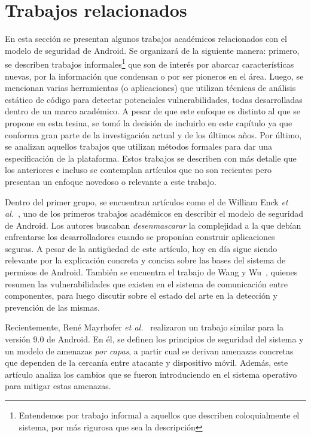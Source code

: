 
\chapter{Trabajos relacionados}
\label{chapter:estado}

En esta sección se presentan algunos trabajos académicos relacionados con el modelo de seguridad de
Android. Se organizará de la siguiente manera: primero, se describen trabajos
informales\footnote{Entendemos por trabajo informal a aquellos que describen coloquialmente el
    sistema, por más rigurosa que sea la descripción} que son de interés por abarcar características
nuevas, por la información que condensan o por ser pioneros en el área. Luego, se mencionan varias
herramientas (o aplicaciones) que utilizan técnicas de análisis estático de código para detectar
potenciales vulnerabilidades, todas desarrolladas dentro de un marco académico. A pesar de que este
enfoque  es distinto al que se propone en esta tesina, se tomó la decisión de incluirlo en este
capítulo ya que conforma gran parte de la investigación actual y de los últimos años. Por último, se
analizan aquellos trabajos que utilizan métodos formales para dar una especificación de la
plataforma. Estos trabajos se describen con más detalle que los anteriores e incluso se contemplan
artículos que no son recientes pero presentan un enfoque novedoso o relevante a este trabajo.

Dentro del primer grupo, se encuentran artículos como el de William Enck \textit{et
    al.}~\cite{enck}, uno de los primeros trabajos académicos en describir el modelo de seguridad de
Android. Los autores buscaban \textit{desenmascarar} la complejidad a la que debían enfrentarse los
desarrolladores cuando se proponían construir aplicaciones seguras. A pesar de la antigüedad de este
artículo, hoy en día sigue siendo relevante por la explicación concreta y concisa sobre las bases
del sistema de permisos de Android. También se encuentra el trabajo de Wang y Wu~\cite{wang},
quienes resumen las vulnerabilidades que existen en el sistema de comunicación entre componentes,
para luego discutir sobre el estado del arte en la detección y prevención de las mismas.

Recientemente, René Mayrhofer \textit{et al.}~\cite{mayrhofer} realizaron un trabajo similar para la
versión 9.0 de Android. En él, se definen los principios de seguridad del sistema y un modelo de
amenazas \textit{por capas}, a partir cual se derivan amenazas concretas que dependen de la cercanía
entre atacante y dispositivo móvil. Además, este artículo analiza los cambios que se fueron
introduciendo en el sistema operativo para mitigar estas amenazas.

